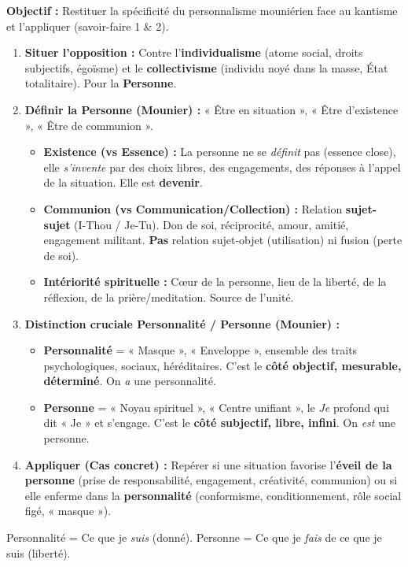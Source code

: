 \documentclass[11pt]{article}
\newcommand{\cle}[1]{{\popxbold\color{popdark}#1}}
\begin{document}
\begin{methode}
\textbf{Objectif :} Restituer la spécificité du personnalisme mouniérien face au kantisme et l'appliquer (savoir-faire 1 \& 2).
\begin{enumerate}
    \item \textbf{Situer l'opposition :} Contre l'\textbf{individualisme} (atome social, droits subjectifs, égoïsme) et le \textbf{collectivisme} (individu noyé dans la masse, État totalitaire). Pour la \textbf{Personne}.
    \item \textbf{Définir la Personne (Mounier) :} « Être en situation », « Être d'existence », « Être de communion ».
    \begin{itemize}
        \item \textbf{Existence (vs Essence) :} La personne ne se \emph{définit} pas (essence close), elle \emph{s'invente} par des choix libres, des engagements, des réponses à l'appel de la situation. Elle est \textbf{devenir}.
        \item \textbf{Communion (vs Communication/Collection) :} Relation \textbf{sujet-sujet} (I-Thou / Je-Tu). Don de soi, réciprocité, amour, amitié, engagement militant. \textbf{Pas} relation sujet-objet (utilisation) ni fusion (perte de soi).
        \item \textbf{Intériorité spirituelle :} Cœur de la personne, lieu de la liberté, de la réflexion, de la prière/meditation. Source de l'unité.
    \end{itemize}
    \item \textbf{Distinction cruciale Personnalité / Personne (Mounier) :}
    \begin{itemize}
        \item \textbf{Personnalité} = « Masque », « Enveloppe », ensemble des traits psychologiques, sociaux, héréditaires. C'est le \textbf{côté objectif, mesurable, déterminé}. On \emph{a} une personnalité.
        \item \textbf{Personne} = « Noyau spirituel », « Centre unifiant », le \emph{Je} profond qui dit « Je » et s'engage. C'est le \textbf{côté subjectif, libre, infini}. On \emph{est} une personne.
    \end{itemize}
    \item \textbf{Appliquer (Cas concret) :} Repérer si une situation favorise l'\textbf{éveil de la personne} (prise de responsabilité, engagement, créativité, communion) ou si elle enferme dans la \textbf{personnalité} (conformisme, conditionnement, rôle social figé, « masque »).
\end{enumerate}
\cle{Personnalité = Ce que je \emph{suis} (donné). Personne = Ce que je \emph{fais} de ce que je suis (liberté).}
\end{methode}
\end{document}
